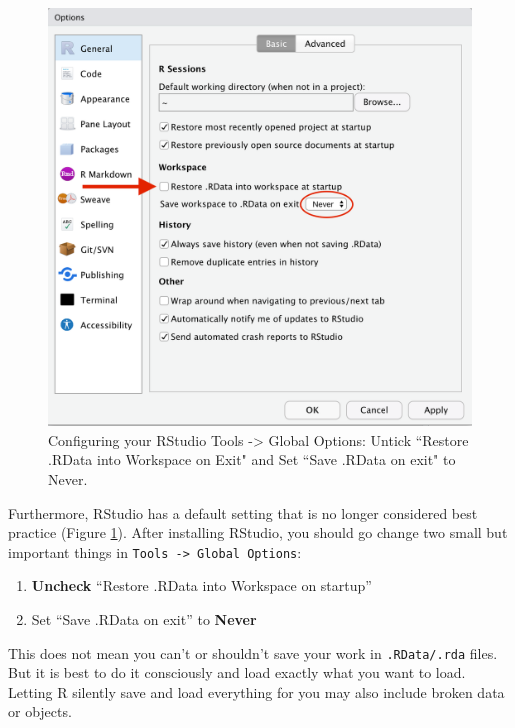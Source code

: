 \documentclass[
  12pt,
  krantz2]{krantz}
\providecommand{\tightlist}{%
  \setlength{\itemsep}{0pt}\setlength{\parskip}{0pt}}
\begin{document}
\begin{figure}
\includegraphics[width=1\linewidth]{images/chapter01/rstudio_settings} \caption{Configuring your RStudio Tools -> Global Options:  Untick ``Restore .RData into Workspace on Exit" and Set ``Save .RData on exit" to Never.}\label{fig:chap01-fig-settings}
\end{figure}

Furthermore, RStudio has a default setting that is no longer considered best practice (Figure \ref{fig:chap01-fig-settings}).
After installing RStudio, you should go change two small but important things in \texttt{Tools\ -\textgreater{}\ Global\ Options}:

\begin{enumerate}
\def\labelenumi{\arabic{enumi}.}
\tightlist
\item
  \textbf{Uncheck} ``Restore .RData into Workspace on startup''
\item
  Set ``Save .RData on exit'' to \textbf{Never}
\end{enumerate}

This does not mean you can't or shouldn't save your work in \texttt{.RData/.rda} files.
But it is best to do it consciously and load exactly what you want to load.
Letting R silently save and load everything for you may also include broken data or objects.
\end{document}
